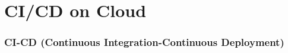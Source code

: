 \setcounter{section}{0}
\part{CI/CD on Cloud}\label{sec:briefCI-CD}

\section{CI-CD (Continuous Integration-Continuous Deployment)}


\newpage
